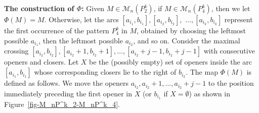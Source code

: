 \documentclass[11pt]{article}
\newcommand{\M}{\mathcal{M}}
\begin{document}
	\textbf{The construction of $\Phi$:} Given $M \in \M_n(P^k_2)$, if $M \in \M_n(P^k_4)$, then we let $\Phi(M)=M$. Otherwise, let the arcs $[a_{i_1}, b_{i_1}], [a_{i_2}, b_{i_2}],$ $\ldots, [a_{i_k}, b_{i_k}]$ represent the first occurrence of the pattern \(P^k_4\) in \(M\), obtained by choosing the leftmost possible \(a_{i_1}\), then the leftmost possible \(a_{i_2}\), and so on. 
	Consider the maximal crossing $[a_{i_2}, b_{i_2}], [a_{i_2}+1, b_{i_2}+1], \ldots, [a_{i_2}+j-1, b_{i_2}+j-1]$ with consecutive openers and closers. Let $X$ be the (possibly empty) set of openers inside the arc $[a_{i_1}, b_{i_1}]$ whose corresponding closers lie to the right of $b_{i_2}$. The map $\Phi(M)$ is defined as follows.
	We move the openers \(a_{i_2}, a_{i_2}+1, \ldots, a_{i_2}+j-1\) to the position immediately preceding the first opener in \(X\) (or \(b_{i_1}\) if \(X = \emptyset\)) as shown in Figure~\ref{fig-M_nP^k_2-M_nP^k_4}.
\end{document}
